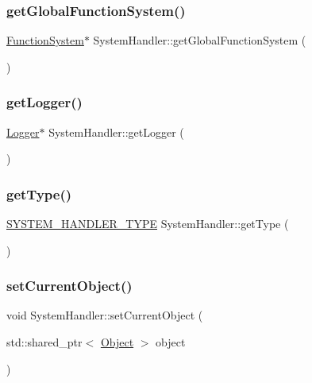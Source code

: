 \subsubsection{\texorpdfstring{get\+Global\+Function\+System()}{getGlobalFunctionSystem()}}
{\footnotesize\ttfamily \hyperlink{classFunctionSystem}{Function\+System}$\ast$ System\+Handler\+::get\+Global\+Function\+System (\begin{DoxyParamCaption}{ }\end{DoxyParamCaption})}

\mbox{\label{classSystemHandler_a2d30e2dd0efb6287ae14b36f1c6bb48b}} 
\subsubsection{\texorpdfstring{get\+Logger()}{getLogger()}}
{\footnotesize\ttfamily \hyperlink{classLogger}{Logger}$\ast$ System\+Handler\+::get\+Logger (\begin{DoxyParamCaption}{ }\end{DoxyParamCaption})}

\mbox{\label{classSystemHandler_a7d5df891633958f20c66e8046019bdcb}} 
\subsubsection{\texorpdfstring{get\+Type()}{getType()}}
{\footnotesize\ttfamily \hyperlink{statics_8h_a28f867553077bc713fdf8921a9226e2e}{S\+Y\+S\+T\+E\+M\+\_\+\+H\+A\+N\+D\+L\+E\+R\+\_\+\+T\+Y\+PE} System\+Handler\+::get\+Type (\begin{DoxyParamCaption}{ }\end{DoxyParamCaption})}

\mbox{\label{classSystemHandler_a2954779b7877d67d7207c4ea27194a0c}} 
\subsubsection{\texorpdfstring{set\+Current\+Object()}{setCurrentObject()}}
{\footnotesize\ttfamily void System\+Handler\+::set\+Current\+Object (\begin{DoxyParamCaption}\item[{std\+::shared\+\_\+ptr$<$ \hyperlink{classObject}{Object} $>$}]{object }\end{DoxyParamCaption})}

